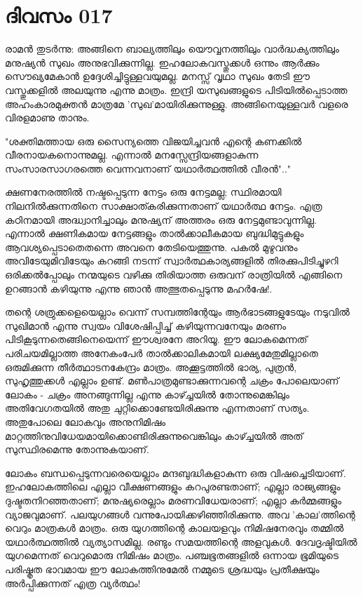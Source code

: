 \newpage
\section{ദിവസം 017}



രാമന്‍ തുടര്‍ന്നു: അങ്ങിനെ ബാല്യത്തിലും യൌവ്വനത്തിലും വാര്‍ദ്ധക്യത്തിലും മനുഷ്യന്‍ സുഖം അനുഭവിക്കുന്നില്ല. ഇഹലോകവസ്തുക്കള്‍ ഒന്നും ആര്‍ക്കും സൌഖ്യമേകാന്‍ ഉദ്ദേശിച്ചിട്ടുള്ളവയുമല്ല. മനസ്സ്‌ വൃഥാ സുഖം തേടി ഈ വസ്തുക്കളില്‍ അലയുന്നു എന്നു മാത്രം. ഇന്ദ്രി യസുഖങ്ങളുടെ പിടിയില്‍പ്പെടാത്ത അഹംകാരമുക്തന്‍ മാത്രമേ 'സുഖ'മായിരിക്കുന്നുള്ളു. അങ്ങിനെയുള്ളവര്‍ വളരെ വിരളമാണു താനും. 

"ശക്തിമത്തായ ഒരു സൈന്യത്തെ വിജയിച്ചവന്‍ എന്റെ കണക്കില്‍ വീരനായകനൊന്നുമല്ല. എന്നാല്‍ മനസ്സേന്ദ്രിയങ്ങളാകുന്ന സംസാരസാഗരത്തെ വെന്നവനാണ്‌ യഥാര്‍ത്ഥത്തില്‍ വീരന്‍".." 

ക്ഷണനേരത്തില്‍ നഷ്ടപ്പെടുന്ന നേട്ടം ഒരു നേട്ടമല്ല; സ്ഥിരമായി നിലനില്‍ക്കുന്നതിനെ സാക്ഷാത്കരിക്കുന്നതാണ്‌ യഥാര്‍ത്ഥ നേട്ടം. എത്ര കഠിനമായി അദ്ധ്വാനിച്ചാലും മനുഷ്യന്‌ അത്തരം ഒരു നേട്ടമുണ്ടാവുന്നില്ല. എന്നാല്‍ ക്ഷണികമായ നേട്ടങ്ങളും താല്‍ക്കാലീകമായ ബുദ്ധിമുട്ടുകളും ആവശ്യപ്പെടാതെതന്നെ അവനെ തേടിയെത്തുന്നു. പകല്‍ മുഴുവനും അവിടേയുമിവിടേയും കറങ്ങി നടന്ന് സ്വാര്‍ത്ഥകാര്യങ്ങളില്‍ തിരക്കുപിടിച്ചുഴറി ഒരിക്കല്‍പ്പോലും നന്മയുടെ വഴിക്കു തിരിയാത്ത ഒരുവന്‌ രാത്രിയില്‍ എങ്ങിനെ ഉറങ്ങാന്‍ കഴിയുന്നു എന്നു ഞാന്‍ അത്ഭുതപ്പെടുന്നു മഹര്‍ഷേ!.

തന്റെ ശത്രുക്കളെയെല്ലാം വെന്ന് സമ്പത്തിന്റേയും ആര്‍ഭാടങ്ങളുടേയും നടുവില്‍ സുഖിമാന്‍ എന്നു സ്വയം വിശേഷിപ്പിച്ച്‌ കഴിയുന്നവനേയും മരണം പിടികൂടുന്നതെങ്ങിനെയെന്ന് ഈശ്വരനേ അറിയൂ. ഈ ലോകമെന്നത്‌ പരിചയമില്ലാത്ത അനേകംപേര്‍ താല്‍ക്കാലികമായി ലക്ഷ്യമേതുമില്ലാതെ ഒരുമിക്കുന്ന തീര്‍ത്ഥാടനകേന്ദ്രം മാത്രം. അക്കൂട്ടത്തില്‍ ഭാര്യ, പുത്രന്‍, സുഹൃത്തുക്കള്‍ എല്ലാം ഉണ്ട്‌. മണ്‍പാത്രമുണ്ടാക്കുന്നവന്റെ ചക്രം പോലെയാണ്‌ ലോകം - ചക്രം അനങ്ങുന്നില്ല എന്നു കാഴ്ച്ചയില്‍ തോന്നുമെങ്കിലും അതിവേഗതയില്‍ അതു ചുറ്റിക്കൊണ്ടേയിരിക്കുന്നു എന്നതാണ്‌ സത്യം. അതുപോലെ ലോകവും അനുനിമിഷം മാറ്റത്തിനുവിധേയമായിക്കൊണ്ടിരിക്കുന്നുവെങ്കിലും കാഴ്ച്ചയില്‍ അത്‌ സുസ്ഥിരമെന്നു തോന്നുകയാണ്‌.

ലോകം ബന്ധപ്പെടുന്നവരെയെല്ലാം മന്ദബുദ്ധികളാകുന്ന ഒരു വിഷച്ചെടിയാണ്‌. ഇഹലോകത്തിലെ എല്ലാ വീക്ഷണങ്ങളും കറപുരണ്ടതാണ്‌; എല്ലാ രാജ്യങ്ങളും ദുഷ്ടതനിറഞ്ഞതാണ്‌; മനുഷ്യരെല്ലാം മരണവിധേയരാണ്‌; എല്ലാ കര്‍മ്മങ്ങളും വ്യാജവുമാണ്‌. പലയുഗങ്ങള്‍ വന്നുപോയിക്കഴിഞ്ഞിരിക്കുന്നു. അവ 'കാല'ത്തിന്റെ വെറും മാത്രകള്‍ മാത്രം. ഒരു യുഗത്തിന്റെ കാലയളവും നിമിഷനേരവും തമ്മില്‍ യഥാര്‍ത്ഥത്തില്‍ വ്യത്യാസമില്ല. രണ്ടും സമയത്തിന്റെ അളവുകള്‍. ദേവദൃഷ്ടിയില്‍ യുഗമെന്നത്‌ വെറുമൊരു നിമിഷം മാത്രം. പഞ്ചഭൂതങ്ങളില്‍ ഒന്നായ ഭൂമിയുടെ പരിഷ്കൃത ഭാവമായ ഈ ലോകത്തിനുമേല്‍ നമ്മുടെ ശ്രദ്ധയും പ്രതീക്ഷയും അര്‍പ്പിക്കുന്നത്‌ എത്ര വ്യര്‍ത്ഥം! 

